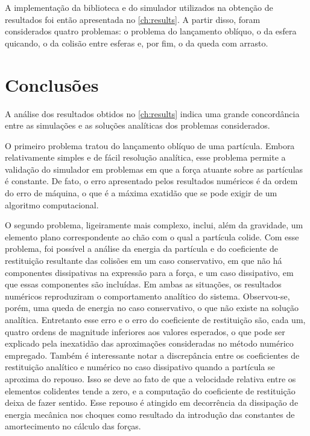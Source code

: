 A implementação da biblioteca e do simulador utilizados na obtenção de resultados foi então apresentada no \cref{ch:results}. A partir disso, foram considerados quatro problemas: o problema do lançamento oblíquo, o da esfera quicando, o da colisão entre esferas e, por fim, o da queda com arrasto.

\section{Conclusões}

A análise dos resultados obtidos no \cref{ch:results} indica uma grande concordância entre as simulações e as soluções analíticas dos problemas considerados.

O primeiro problema tratou do lançamento oblíquo de uma partícula. Embora relativamente simples e de fácil resolução analítica, esse problema permite a validação do simulador em problemas em que a força atuante sobre as partículas é constante. De fato, o erro apresentado pelos resultados numéricos é da ordem do erro de máquina, o que é a máxima exatidão que se pode exigir de um algoritmo computacional.

O segundo problema, ligeiramente mais complexo, inclui, além da gravidade, um elemento plano correspondente ao chão com o qual a partícula colide. Com esse problema, foi possível a análise da energia da partícula e do coeficiente de restituição resultante das colisões em um caso conservativo, em que não há componentes dissipativas na expressão para a força, e um caso dissipativo, em que essas componentes são incluídas. Em ambas as situações, os resultados numéricos reproduziram o comportamento analítico do sistema. Observou-se, porém, uma queda de energia no caso conservativo, o que não existe na solução analítica. Entretanto esse erro e o erro do coeficiente de restituição são, cada um, quatro ordens de magnitude inferiores aos valores esperados, o que pode ser explicado pela inexatidão das aproximações consideradas no método numérico empregado. Também é interessante notar a discrepância entre os coeficientes de restituição analítico e numérico no caso dissipativo quando a partícula se aproxima do repouso. Isso se deve ao fato de que a velocidade relativa entre os elementos colidentes tende a zero, e a computação do coeficiente de restituição deixa de fazer sentido. Esse repouso é atingido em decorrência da dissipação de energia mecânica nos choques como resultado da introdução das constantes de amortecimento no cálculo das forças.

